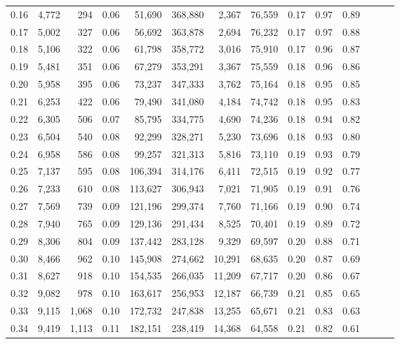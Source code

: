 \begin{tabular}{rrrrrrrrrrrrrr}
0.16 &  4,772 &    294 &  0.06 &   51,690 &  368,880 &   2,367 &  76,559 &  0.17 &  0.97 &      0.89 \\
0.17 &  5,002 &    327 &  0.06 &   56,692 &  363,878 &   2,694 &  76,232 &  0.17 &  0.97 &      0.88 \\
0.18 &  5,106 &    322 &  0.06 &   61,798 &  358,772 &   3,016 &  75,910 &  0.17 &  0.96 &      0.87 \\
0.19 &  5,481 &    351 &  0.06 &   67,279 &  353,291 &   3,367 &  75,559 &  0.18 &  0.96 &      0.86 \\
0.20 &  5,958 &    395 &  0.06 &   73,237 &  347,333 &   3,762 &  75,164 &  0.18 &  0.95 &      0.85 \\
0.21 &  6,253 &    422 &  0.06 &   79,490 &  341,080 &   4,184 &  74,742 &  0.18 &  0.95 &      0.83 \\
0.22 &  6,305 &    506 &  0.07 &   85,795 &  334,775 &   4,690 &  74,236 &  0.18 &  0.94 &      0.82 \\
0.23 &  6,504 &    540 &  0.08 &   92,299 &  328,271 &   5,230 &  73,696 &  0.18 &  0.93 &      0.80 \\
0.24 &  6,958 &    586 &  0.08 &   99,257 &  321,313 &   5,816 &  73,110 &  0.19 &  0.93 &      0.79 \\
0.25 &  7,137 &    595 &  0.08 &  106,394 &  314,176 &   6,411 &  72,515 &  0.19 &  0.92 &      0.77 \\
0.26 &  7,233 &    610 &  0.08 &  113,627 &  306,943 &   7,021 &  71,905 &  0.19 &  0.91 &      0.76 \\
0.27 &  7,569 &    739 &  0.09 &  121,196 &  299,374 &   7,760 &  71,166 &  0.19 &  0.90 &      0.74 \\
0.28 &  7,940 &    765 &  0.09 &  129,136 &  291,434 &   8,525 &  70,401 &  0.19 &  0.89 &      0.72 \\
0.29 &  8,306 &    804 &  0.09 &  137,442 &  283,128 &   9,329 &  69,597 &  0.20 &  0.88 &      0.71 \\
0.30 &  8,466 &    962 &  0.10 &  145,908 &  274,662 &  10,291 &  68,635 &  0.20 &  0.87 &      0.69 \\
0.31 &  8,627 &    918 &  0.10 &  154,535 &  266,035 &  11,209 &  67,717 &  0.20 &  0.86 &      0.67 \\
0.32 &  9,082 &    978 &  0.10 &  163,617 &  256,953 &  12,187 &  66,739 &  0.21 &  0.85 &      0.65 \\
0.33 &  9,115 &  1,068 &  0.10 &  172,732 &  247,838 &  13,255 &  65,671 &  0.21 &  0.83 &      0.63 \\
0.34 &  9,419 &  1,113 &  0.11 &  182,151 &  238,419 &  14,368 &  64,558 &  0.21 &  0.82 &      0.61 \\

\end{tabular}
